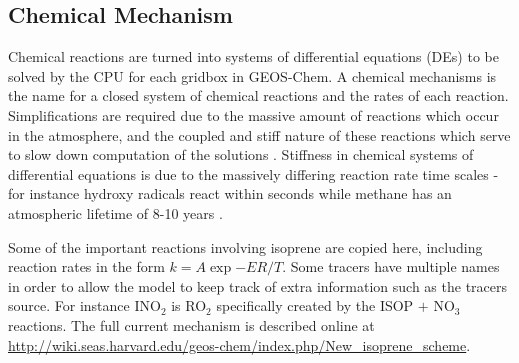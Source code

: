   \subsection{Chemical Mechanism}
    \label{Model:GC:Mechanisms}
    Chemical reactions are turned into systems of differential equations (DEs) to be solved by the CPU for each gridbox in GEOS-Chem.
    A chemical mechanisms is the name for a closed system of chemical reactions and the rates of each reaction.
    Simplifications are required due to the massive amount of reactions which occur in the atmosphere, and the coupled and stiff nature of these reactions which serve to slow down computation of the solutions \parencite{BrasseurJacob2017}.
    Stiffness in chemical systems of differential equations is due to the massively differing reaction rate time scales - for instance hydroxy radicals react within seconds while methane has an atmospheric lifetime of 8-10 years \parencite{Wuebbles2002}. 
    
    Some of the important reactions involving isoprene are copied here, including reaction rates in the form $ k = A \exp{-ER/T}$.
    Some tracers have multiple names in order to allow the model to keep track of extra information such as the tracers source.
    For instance INO$_2$ is RO$_2$ specifically created by the ISOP $+$ NO$_3$ reactions.
    The full current mechanism is described online at \url{http://wiki.seas.harvard.edu/geos-chem/index.php/New_isoprene_scheme}.
    
